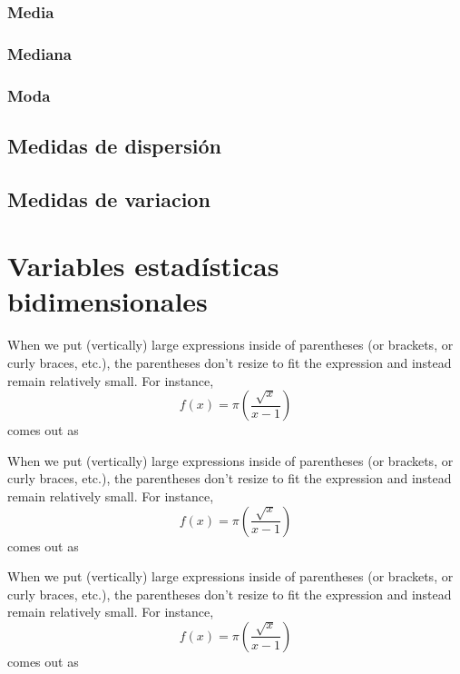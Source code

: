 \documentclass[a4paper]{report}
\begin{document}
\subsection{Media}


\subsection{Mediana}
\subsection{Moda}


\section{Medidas de dispersión}
\section{Medidas de variacion}



\chapter{Variables estadísticas bidimensionales}

When we put (vertically) large expressions inside of parentheses (or brackets, or curly braces, etc.), the parentheses don't resize to fit the expression and instead remain relatively small. For instance, $$f(x) = \pi(\frac{\sqrt{x}}{x-1})$$ comes out as

When we put (vertically) large expressions inside of parentheses (or brackets, or curly braces, etc.), the parentheses don't resize to fit the expression and instead remain relatively small. For instance, $$f(x) = \pi(\frac{\sqrt{x}}{x-1})$$ comes out as

When we put (vertically) large expressions inside of parentheses (or brackets, or curly braces, etc.), the parentheses don't resize to fit the expression and instead remain relatively small. For instance, $$f(x) = \pi(\frac{\sqrt{x}}{x-1})$$ comes out as
\end{document}
